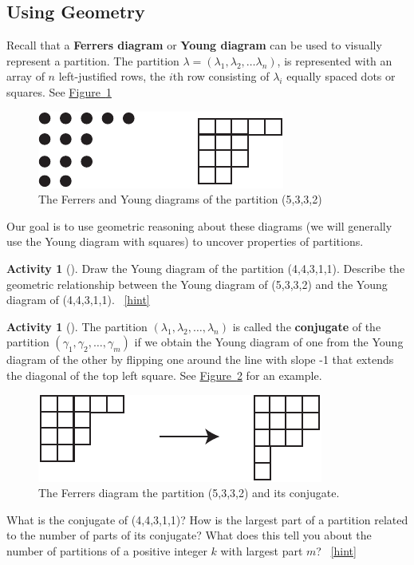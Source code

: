 \documentclass[10pt,]{book}
\newcommand{\terminology}[1]{\textbf{#1}}
\theoremstyle{plain}
\theoremstyle{definition}
\theoremstyle{definition}
\theoremstyle{definition}
\newtheorem{activity}[project]{Activity}
\numberwithin{equation}{chapter}
\begin{document}
\subsection[{Using Geometry}]{Using Geometry}\label{subsec_linearpartitionsgeom}
\hypertarget{p-1500}{}%
Recall that a \terminology{Ferrers diagram} or \terminology{Young diagram} can be used to visually represent a partition.  The partition \(\lambda = (\lambda_1,\lambda_2,\ldots \lambda_n)\), is represented with an array of \(n\) left-justified rows, the \(i\)th row consisting of \(\lambda_i\) equally spaced dots or squares.  See \hyperref[FerrersYoung-repeat]{Figure~\ref{FerrersYoung-repeat}}%
\begin{figure}
\centering
\includegraphics[width=0.45\linewidth]{images/FerrersYoung}
\caption{The Ferrers and Young diagrams of the partition (5,3,3,2)\label{FerrersYoung-repeat}}
\end{figure}
\hypertarget{p-1501}{}%
Our goal is to use geometric reasoning about these diagrams (we will generally use the Young diagram with squares) to uncover properties of partitions.%
\begin{activity}[]\label{activity-296}
\hypertarget{p-1502}{}%
Draw the Young diagram of the partition (4,4,3,1,1). Describe the geometric relationship between the Young diagram of (5,3,3,2) and the Young diagram of (4,4,3,1,1).%
~\hfill{\tiny\hyperlink{a-303}{[hint]}\hypertarget{q-303}{}}\end{activity}
\begin{activity}[]\label{activity-297}
\hypertarget{p-1505}{}%
The partition \((\lambda_1,\lambda_2,\ldots, \lambda_n)\) is called the \terminology{conjugate} of the partition \((\gamma_1,\gamma_2,\ldots, \gamma_m)\) if we obtain the Young diagram of one from the Young diagram of the other by flipping one around the line with slope -1 that extends the diagonal of the top left square. See \hyperref[conjugateYoung]{Figure~\ref{conjugateYoung}} for an example.%
\begin{figure}
\centering
\includegraphics[width=0.5\linewidth]{images/conjugateYoung}
\caption{The Ferrers diagram the partition (5,3,3,2) and its conjugate.\label{conjugateYoung}}
\end{figure}
\hypertarget{p-1506}{}%
What is the conjugate of (4,4,3,1,1)? How is the largest part of a partition related to the number of parts of its conjugate? What does this tell you about the number of partitions of a positive integer \(k\) with largest part \(m\)?%
~\hfill{\tiny\hyperlink{a-304}{[hint]}\hypertarget{q-304}{}}\end{activity}
\end{document}
